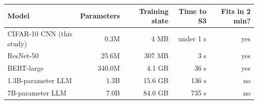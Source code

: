 \begin{tabular}{lrrrr}
\toprule
Model & Parameters & Training state & Time to S3 & Fits in 2 min? \\
\midrule
CIFAR-10 CNN (this study) & 0.3M & 4 MB & under 1 s & yes \\
ResNet-50 & 25.6M & 307 MB & 3 s & yes \\
BERT-large & 340.0M & 4.1 GB & 36 s & yes \\
1.3B-parameter LLM & 1.3B & 15.6 GB & 136 s & no \\
7B-parameter LLM & 7.0B & 84.0 GB & 735 s & no \\
\bottomrule
\end{tabular}
